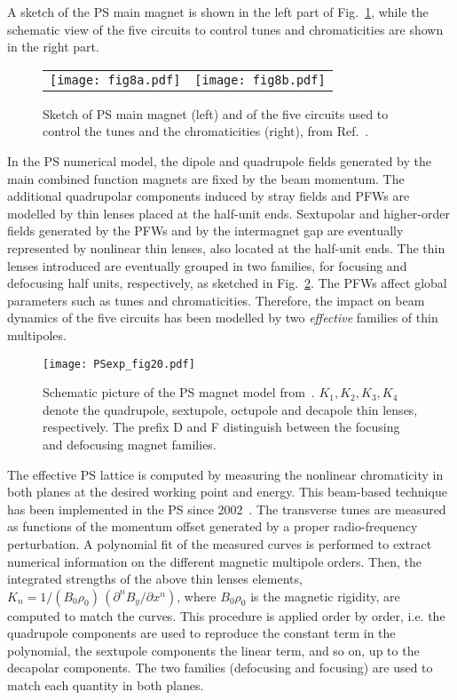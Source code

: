 \documentclass{article}
\begin{document}
A sketch of the PS main magnet is shown in the left part of Fig.~\ref{fig_a}, while the schematic view of the five circuits to control tunes and chromaticities are shown in the right part.
%
\begin{figure}[htb]
\begin{tabular}{cc}
  \texttt{[image: fig8a.pdf]} &
  \texttt{[image: fig8b.pdf]}
\end{tabular}	
  \caption{\label{fig_a} Sketch of PS main magnet (left) and of the five circuits used to control the tunes and the chromaticities (right), from Ref.~\cite{marius}.}
\end{figure}
%
In the PS numerical model, the dipole and quadrupole fields generated by the main combined function magnets are fixed by the beam momentum. The additional quadrupolar components induced by stray fields and PFWs are modelled by thin lenses placed at the half-unit ends. Sextupolar and higher-order fields generated by the PFWs and by the intermagnet gap are eventually represented by nonlinear thin lenses, also located at the half-unit ends. The thin lenses introduced are eventually grouped in two families, for focusing and defocusing half units, respectively, as sketched in Fig.~\ref{fig_b}. The PFWs affect global parameters such as tunes and chromaticities. Therefore, the impact on beam dynamics of the five circuits has been modelled by two {\sl effective} families of thin multipoles.
\begin{figure}[htb]
\centering
  \texttt{[image: PSexp\_fig20.pdf]}
  \caption{\label{fig_b}Schematic picture of the PS magnet model from~\cite{MTE-prog}. $K_1, K_2, K_3, K_4$ denote the quadrupole, sextupole, octupole and decapole thin lenses, respectively. The prefix D and F distinguish between the focusing and defocusing magnet families.}
\end{figure}
The effective PS lattice is computed by measuring the nonlinear chromaticity in both planes at the desired working point and energy. This beam-based technique has been implemented in the PS since 2002~\cite{PS-CHROM}. The transverse tunes are measured as functions of the momentum offset generated by a proper  radio-frequency perturbation. A polynomial fit of the measured curves is performed to extract numerical information on the different magnetic multipole orders. Then, the integrated strengths of the above thin lenses elements, $K_n=1/(B_0\rho_0)\, (\partial^nB_y/\partial x^n)$, where $B_0\rho_0$ is the magnetic rigidity, are computed to match the curves. This procedure is applied order by order, i.e. the quadrupole components are used to reproduce the constant term in the polynomial, the sextupole components the linear term, and so on, up to the decapolar components. The two families (defocusing and focusing) are used to match each quantity in both planes.
\end{document}
